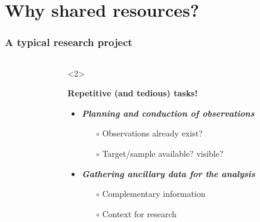 \section{Why shared resources?}


\begin{frame}
  \frametitle{A typical research project}

  \begin{columns}[T]

    \begin{column}{.4\textwidth}
      \begin{overlayarea}{\textwidth}{\textheight}
      \end{overlayarea}
    \end{column}


    \begin{column}{.6\textwidth}
      \begin{overlayarea}{\textwidth}{\textheight}
        \begin{onlyenv}<2>

          \vspace{1em}
          \textbf{\bf Repetitive (and tedious) tasks!}\\
          \vspace{1em}
          \begin{itemize}[<.->]
            \item \emph{\bf Planning and conduction of observations}
              \begin{itemize}[<.->]
                \item[$\circ$] Observations already exist?
                \item[$\circ$] Target/sample available? visible?
              \end{itemize}

            \vspace{0.5em}
            \item \emph{\bf Gathering ancillary data for the analysis}
              \begin{itemize}[<.->]
                \item[$\circ$] Complementary information 
                \item[$\circ$] Context for research 
              \end{itemize}


\end{itemize}
\end{onlyenv}
\end{overlayarea}
\end{column}
\end{columns}
\end{frame}
